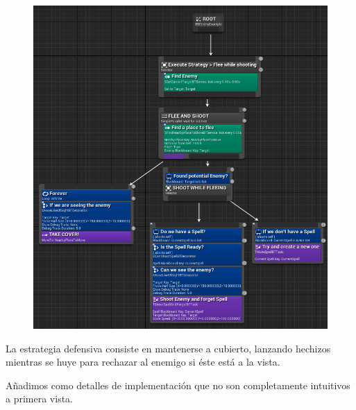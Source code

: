 \documentclass[12pt]{report}
\begin{document}
\begin{figure}[H]
    \centering
    \includegraphics[width=1\textwidth]{defensive_behavior_tree}
\end{figure}

La estrategia defensiva consiste en mantenerse a cubierto, lanzando hechizos mientras se huye para rechazar al enemigo si éste está a la vista.

Añadimos como detalles de implementación que no son completamente intuitivos a primera vista.
\end{document}
